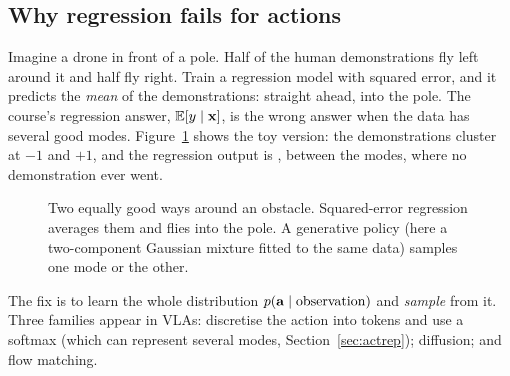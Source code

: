 \subsection{Why regression fails for actions}
Imagine a drone in front of a pole. Half of the human demonstrations fly left around it and half fly right. Train a regression model with squared error, and it predicts the \emph{mean} of the demonstrations: straight ahead, into the pole. The course's regression answer, $\mathbb{E}[y\mid\mathbf{x}]$, is the wrong answer when the data has several good modes. Figure~\ref{fig:bimodal} shows the toy version: the demonstrations cluster at $-1$ and $+1$, and the regression output is \bimean, between the modes, where no demonstration ever went.

\begin{figure}[h]
\centering
{}
\caption{Two equally good ways around an obstacle. Squared-error regression averages them and flies into the pole. A generative policy (here a two-component Gaussian mixture fitted to the same data) samples one mode or the other.}
\label{fig:bimodal}
\end{figure}

The fix is to learn the whole distribution $p(\mathbf{a}\mid\text{observation})$ and \emph{sample} from it. Three families appear in VLAs: discretise the action into tokens and use a softmax (which can represent several modes, Section~\ref{sec:actrep}); diffusion; and flow matching.

